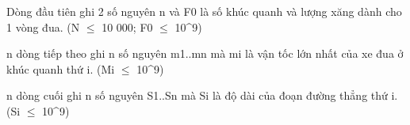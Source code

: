 Dòng đầu tiên ghi 2 số nguyên n và F0 là số khúc quanh và lượng xăng dành cho 1 vòng đua. (N $\le$ 10 000; F0 $\le$ 10^9)

n dòng tiếp theo ghi n số nguyên m1..mn mà mi là vận tốc lớn nhất của xe đua ở khúc quanh thứ i. (Mi $\le$ 10^9)

n dòng cuối ghi n số nguyên S1..Sn mà Si là độ dài của đoạn đường thẳng thứ i. (Si $\le$ 10^9)